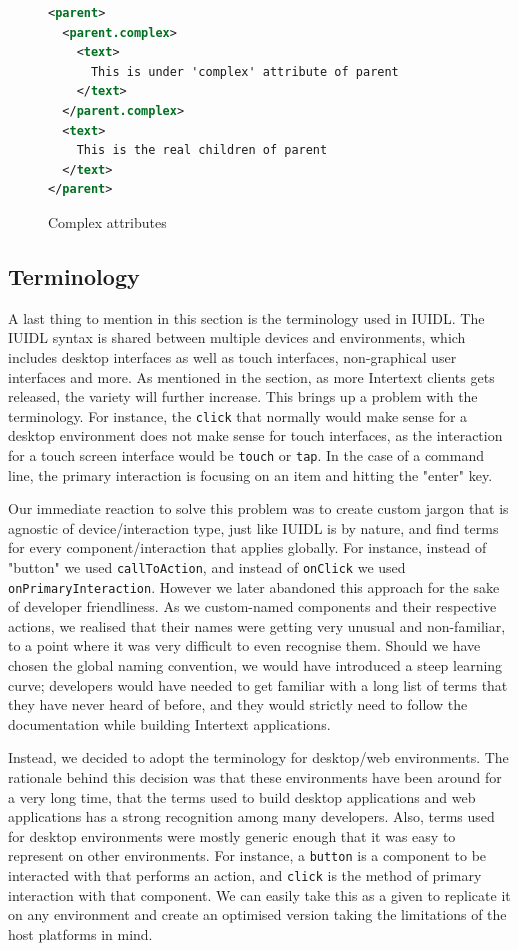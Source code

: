 \begin{figure}
\begin{minipage}{\linewidth}
\begin{lstlisting}[language=xml]
<parent>
  <parent.complex>
    <text>
      This is under 'complex' attribute of parent
    </text>
  </parent.complex>
  <text>
    This is the real children of parent
  </text>
</parent>
\end{lstlisting}
\end{minipage}
\caption{Complex attributes}%
\label{fig:complex_attributes}%
\end{figure}


\subsection{Terminology}

A last thing to mention in this section is the terminology used in IUIDL. The IUIDL syntax is shared between multiple devices and environments, which includes desktop interfaces as well as touch interfaces, non-graphical user interfaces and more. As mentioned in the  section, as more Intertext clients gets released, the variety will further increase. This brings up a problem with the terminology. For instance, the \texttt{click} that normally would make sense for a desktop environment does not make sense for touch interfaces, as the interaction for a touch screen interface would be \texttt{touch} or \texttt{tap}. In the case of a command line, the primary interaction is focusing on an item and hitting the "enter" key. 

Our immediate reaction to solve this problem was to create custom jargon that is agnostic of device/interaction type, just like IUIDL is by nature, and find terms for every component/interaction that applies globally. For instance, instead of "button" we used \texttt{callToAction}, and instead of \texttt{onClick} we used \texttt{onPrimaryInteraction}. However we later abandoned this approach for the sake of developer friendliness. As we custom-named components and their respective actions, we realised that their names were getting very unusual and non-familiar, to a point where it was very difficult to even recognise them. Should we have chosen the global naming convention, we would have introduced a steep learning curve; developers would have needed to get familiar with a long list of terms that they have never heard of before, and they would strictly need to follow the documentation while building Intertext applications.

Instead, we decided to adopt the terminology for desktop/web environments. The rationale behind this decision was that these environments have been around for a very long time, that the terms used to build desktop applications and web applications has a strong recognition among many developers. Also, terms used for desktop environments were mostly generic enough that it was easy to represent on other environments. For instance, a \texttt{button} is a component to be interacted with that performs an action, and \texttt{click} is the method of primary interaction with that component. We can easily take this as a given to replicate it on any environment and create an optimised version taking the limitations of the host platforms in mind.